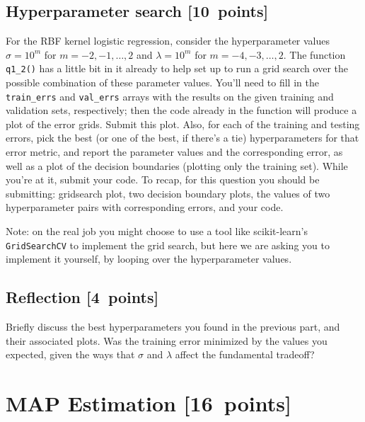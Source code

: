 \documentclass{article}
\newcommand{\blu}[1]{{\textcolor{blu}{#1}}}
\let\ask\blu
\newcommand\pts[1]{\textcolor{pointscolour}{[#1~points]}}
\begin{document}
\subsection{Hyperparameter search \pts{10}}

For the RBF kernel logistic regression, consider the hyperparameter values $\sigma=10^m$ for $m=-2,-1,\ldots,2$ and $\lambda=10^m$ for $m=-4,-3,\ldots,2$.
The function \verb|q1_2()| has a little bit in it already to help set up to run a grid search over the possible combination of these parameter values.
You'll need to fill in the \verb|train_errs| and \verb|val_errs| arrays
with the results on the given training and validation sets, respectively;
then the code already in the function will produce a plot of the error grids.
\ask{Submit this plot}.
Also, for each of the training and testing errors,
pick the best (or one of the best, if there's a tie) hyperparameters for that error metric,
and \ask{report the parameter values and the corresponding error, as well as a plot of the decision boundaries (plotting only the training set)}.
While you're at it, \ask{submit your code}.
To recap, for this question you should be submitting: gridsearch plot,
two decision boundary plots,
the values of two hyperparameter pairs with corresponding errors,
and your code.

Note: on the real job you might choose to use a tool like scikit-learn's \texttt{GridSearchCV} to implement the grid search, but here we are asking you to implement it yourself, by looping over the hyperparameter values.


\subsection{Reflection \pts{4}}
\ask{
Briefly discuss the best hyperparameters you found in the previous part, and their associated plots. Was the training error minimized by the values you expected, given the ways that $\sigma$ and $\lambda$ affect the fundamental tradeoff?
}

\clearpage
\section{MAP Estimation \pts{16}}
\end{document}
